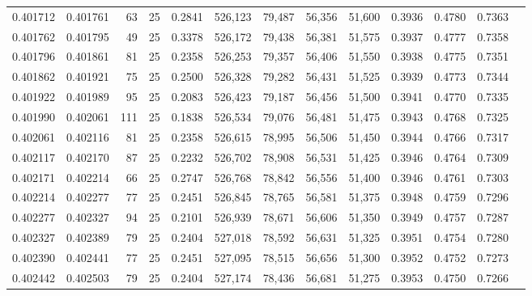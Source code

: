 \begin{tabular}{rrrrrrrrrrrrr}
0.401712 & 0.401761 &    63 &  25 &                                     0.2841 & 526,123 &  79,487 &  56,356 &  51,600 & 0.3936 & 0.4780 & 0.7363 \\
0.401762 & 0.401795 &    49 &  25 &                                     0.3378 & 526,172 &  79,438 &  56,381 &  51,575 & 0.3937 & 0.4777 & 0.7358 \\
0.401796 & 0.401861 &    81 &  25 &                                     0.2358 & 526,253 &  79,357 &  56,406 &  51,550 & 0.3938 & 0.4775 & 0.7351 \\
0.401862 & 0.401921 &    75 &  25 &                                     0.2500 & 526,328 &  79,282 &  56,431 &  51,525 & 0.3939 & 0.4773 & 0.7344 \\
0.401922 & 0.401989 &    95 &  25 &                                     0.2083 & 526,423 &  79,187 &  56,456 &  51,500 & 0.3941 & 0.4770 & 0.7335 \\
0.401990 & 0.402061 &   111 &  25 &                                     0.1838 & 526,534 &  79,076 &  56,481 &  51,475 & 0.3943 & 0.4768 & 0.7325 \\
0.402061 & 0.402116 &    81 &  25 &                                     0.2358 & 526,615 &  78,995 &  56,506 &  51,450 & 0.3944 & 0.4766 & 0.7317 \\
0.402117 & 0.402170 &    87 &  25 &                                     0.2232 & 526,702 &  78,908 &  56,531 &  51,425 & 0.3946 & 0.4764 & 0.7309 \\
0.402171 & 0.402214 &    66 &  25 &                                     0.2747 & 526,768 &  78,842 &  56,556 &  51,400 & 0.3946 & 0.4761 & 0.7303 \\
0.402214 & 0.402277 &    77 &  25 &                                     0.2451 & 526,845 &  78,765 &  56,581 &  51,375 & 0.3948 & 0.4759 & 0.7296 \\
0.402277 & 0.402327 &    94 &  25 &                                     0.2101 & 526,939 &  78,671 &  56,606 &  51,350 & 0.3949 & 0.4757 & 0.7287 \\
0.402327 & 0.402389 &    79 &  25 &                                     0.2404 & 527,018 &  78,592 &  56,631 &  51,325 & 0.3951 & 0.4754 & 0.7280 \\
0.402390 & 0.402441 &    77 &  25 &                                     0.2451 & 527,095 &  78,515 &  56,656 &  51,300 & 0.3952 & 0.4752 & 0.7273 \\
0.402442 & 0.402503 &    79 &  25 &                                     0.2404 & 527,174 &  78,436 &  56,681 &  51,275 & 0.3953 & 0.4750 & 0.7266 \\

\end{tabular}
